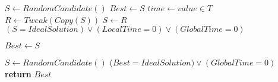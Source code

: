 \documentclass{standalone}
\begin{document}
\begin{varwidth}{\linewidth}
\par\noindent
 \begin{algorithmic}[1]
 \State $S \gets RandomCandidate()$
 \State $Best \gets S$
 \Repeat
 \State $time \gets value \in T$
 \Repeat
     \State $R\gets Tweak(Copy(S))$
     \State $S \gets R$
     \EndIf
 \Until $(S = IdealSolution) \lor (LocalTime=0) \lor(GlobalTime=0)$

     \State $Best \gets S$
 \EndIf

 \State $S \gets RandomCandidate()$
 \Until ($Best = IdealSolution) \lor (GlobalTime=0)$
 \State \textbf{return} $Best$
 \EndProcedure
 \end{algorithmic}
\end{varwidth}
\end{document}
